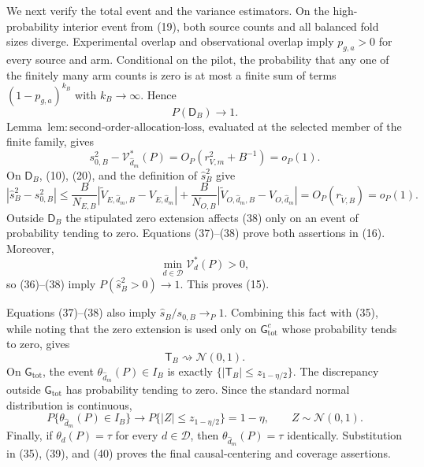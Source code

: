 We next verify the total event and the variance estimators.  On the high-probability interior event from (19), both source counts and all balanced fold sizes diverge.  Experimental overlap and observational overlap imply \(p_{g,a}>0\) for every source and arm.  Conditional on the pilot, the probability that any one of the finitely many arm counts is zero is at most a finite sum of terms \((1-p_{g,a})^{k_B}\) with \(k_B\to\infty\).  Hence
\[
 P(\mathsf D_B)\longrightarrow1.                                  \tag{36}
\]
Lemma~\(\mathrm{lem{:}second\text{-}order\text{-}allocation\text{-}loss}\), evaluated at the selected member of the finite family, gives
\[
 s_{0,B}^2-\mathcal V_{\widehat d_m}^*(P)
 =O_P(r_{V,m}^2+B^{-1})=o_P(1).                                   \tag{37}
\]
On \(\mathsf D_B\), (10), (20), and the definition of \(\widehat s_B^2\) give
\[
 |\widehat s_B^2-s_{0,B}^2|
 \le \frac{B}{N_{E,B}}
 |\widetilde V_{E,\widehat d_m,B}-V_{E,\widehat d_m}|
 +\frac{B}{N_{O,B}}
 |\widetilde V_{O,\widehat d_m,B}-V_{O,\widehat d_m}|
 =O_P(r_{\widetilde V,B})=o_P(1).                                \tag{38}
\]
Outside \(\mathsf D_B\) the stipulated zero extension affects (38) only on an event of probability tending to zero.  Equations (37)--(38) prove both assertions in (16).  Moreover,
\[
 \min_{d\in\mathcal D}\mathcal V_d^*(P)>0,
\]
so (36)--(38) imply \(P(\widehat s_B^2>0)\to1\).  This proves (15).

Equations (37)--(38) also imply \(\widehat s_B/s_{0,B}\to_P1\).  Combining this fact with (35), while noting that the zero extension is used only on \(\mathsf G_{\mathrm{tot}}^c\) whose probability tends to zero, gives
\[
 \mathsf T_B\rightsquigarrow\mathcal N(0,1).                    \tag{39}
\]
On \(\mathsf G_{\mathrm{tot}}\), the event \(\theta_{\widehat d_m}(P)\in I_B\) is exactly \(\{|\mathsf T_B|\le z_{1-\eta/2}\}\).  The discrepancy outside \(\mathsf G_{\mathrm{tot}}\) has probability tending to zero.  Since the standard normal distribution is continuous,
\[
 P\{\theta_{\widehat d_m}(P)\in I_B\}
 \longrightarrow
 P\{|Z|\le z_{1-\eta/2}\}=1-\eta,
 \qquad Z\sim\mathcal N(0,1).                                    \tag{40}
\]
Finally, if \(\theta_d(P)=\tau\) for every \(d\in\mathcal D\), then \(\theta_{\widehat d_m}(P)=\tau\) identically.  Substitution in (35), (39), and (40) proves the final causal-centering and coverage assertions.